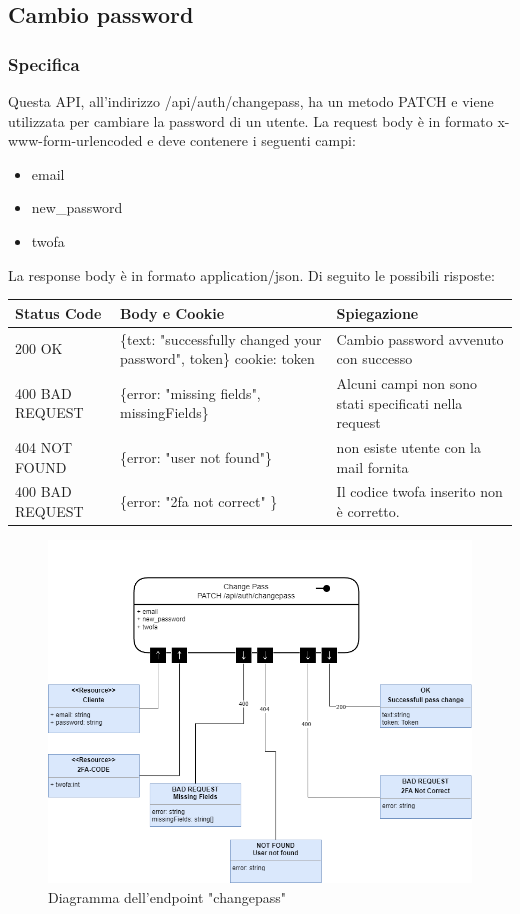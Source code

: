 \documentclass{report}
\begin{document}
\subsection{Cambio password}
\subsubsection*{Specifica}
Questa API, all'indirizzo /api/auth/changepass, ha un metodo PATCH e viene utilizzata per cambiare la password di un utente.
La request body è in formato x-www-form-urlencoded e deve contenere i seguenti campi:
\begin{itemize}
	\item email
	\item new\_password
	\item twofa
\end{itemize}
La response body è in formato application/json. Di seguito le possibili risposte:
\begin{center} %
	\centering
	\begin{tabular}{ |p{4cm}|p{5cm}|p{4cm}| }
		\hline
		\centering Status Code & \qquad\quad Body e Cookie & \qquad\qquad Spiegazione\\ %
		\hline
		200 OK & \{text: "successfully changed your password", token\} cookie: token & Cambio password avvenuto con successo	\\
		\hline
		400 BAD REQUEST & \{error: "missing fields", missingFields\} & Alcuni campi non sono stati specificati nella request\\ %
		\hline
		404 NOT FOUND & \{error: "user not found"\} & non esiste utente con la mail fornita \\%
		\hline
		400 BAD REQUEST & \{error: "2fa not correct" \} & Il codice twofa inserito non è corretto. \\
		\hline
	\end{tabular}
\end{center}
\begin{figure}[H]
	\centering\includegraphics[width=1\textwidth]{images/microservizio-autenticazione/diagrams/diagramma_changepass.drawio.png}
	\caption{Diagramma dell'endpoint "changepass"}
\end{figure}
\end{document}
